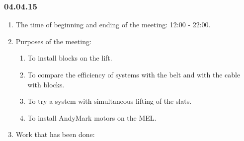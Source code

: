 \subsubsection{04.04.15}
\begin{enumerate}
	
	\item The time of beginning and ending of the meeting: 12:00 - 22:00.
	
	\item Purposes of the meeting: 
	\begin{enumerate}
		
		\item To install blocks on the lift.
		
		\item To compare the efficiency of systems with the belt and with the cable with blocks.
		
		\item To try a system with simultaneous lifting of the slats.
		
        \item To install AndyMark motors on the MEL.
		
	\end{enumerate}

	\item Work that has been done:
	\begin{enumerate}
		

\end{enumerate}
\end{enumerate}
